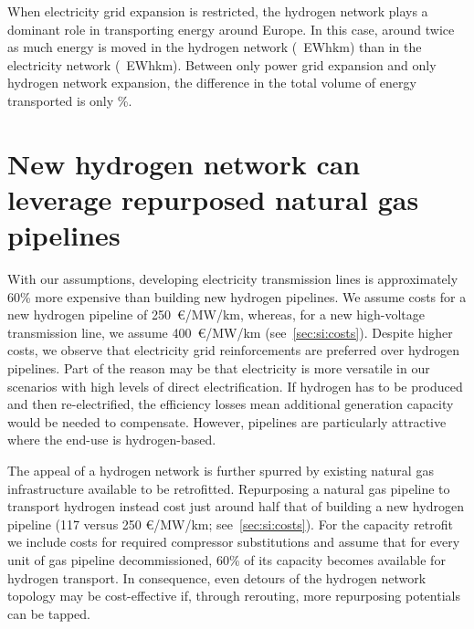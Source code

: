 When electricity grid expansion is restricted, the hydrogen network plays a
dominant role in transporting energy around Europe. In this case, around twice
as much energy is moved in the hydrogen network (\ewhkmhydrogen~EWhkm) than in
the electricity network (\ewhkmelectricity~EWhkm). Between only power grid
expansion and only hydrogen network expansion, the difference in the total
volume of energy transported is only \ewhkmdiff\%.

\section*{New hydrogen network can leverage repurposed natural gas pipelines}
\label{sec:repurposed}

With our assumptions, developing electricity transmission lines is approximately
60\% more expensive than building new hydrogen pipelines. We assume costs for a
new hydrogen pipeline of 250~\euro/MW/km, whereas, for a new high-voltage
transmission line, we assume 400~\euro/MW/km (see~\cref{sec:si:costs}). Despite
higher costs, we observe that electricity grid reinforcements are preferred over
hydrogen pipelines. Part of the reason may be that electricity is more versatile
in our scenarios with high levels of direct electrification. If hydrogen has to
be produced and then re-electrified, the efficiency losses mean additional
generation capacity would be needed to compensate. However, pipelines are
particularly attractive where the end-use is hydrogen-based.

The appeal of a hydrogen network is further spurred by existing natural gas
infrastructure available to be retrofitted. Repurposing a natural gas pipeline
to transport hydrogen instead cost just around half that of building a new
hydrogen pipeline (117 versus 250 \euro/MW/km; see~\cref{sec:si:costs}). For the
capacity retrofit we include costs for required compressor substitutions and
assume that for every unit of gas pipeline decommissioned, 60\% of its capacity
becomes available for hydrogen transport. In consequence, even detours of the
hydrogen network topology may be cost-effective if, through rerouting, more
repurposing potentials can be tapped.

